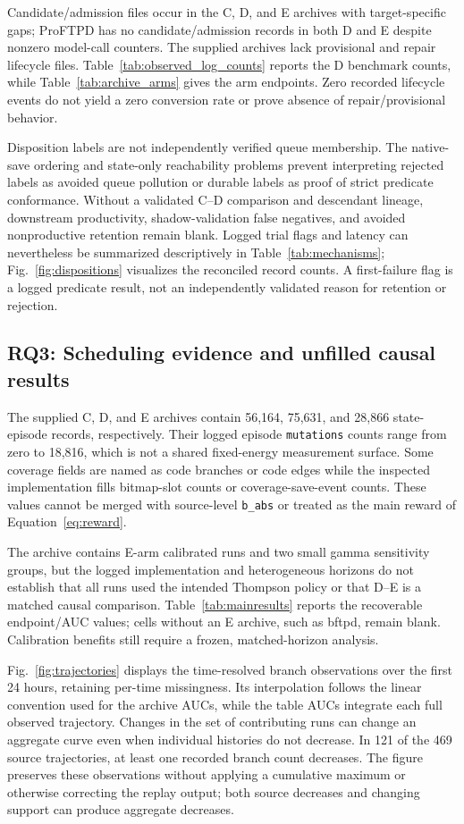 \documentclass[final,5p,times,number]{elsarticle}
\newcommand{\figref}[1]{Fig.~\ref{#1}}
\begin{document}
Candidate/admission files occur in the C, D, and E archives with target-specific gaps; ProFTPD has no candidate/admission records in both D and E despite nonzero model-call counters. The supplied archives lack provisional and repair lifecycle files. Table~\ref{tab:observed_log_counts} reports the D benchmark counts, while Table~\ref{tab:archive_arms} gives the arm endpoints. Zero recorded lifecycle events do not yield a zero conversion rate or prove absence of repair/provisional behavior.

Disposition labels are not independently verified queue membership. The native-save ordering and state-only reachability problems prevent interpreting rejected labels as avoided queue pollution or durable labels as proof of strict predicate conformance. Without a validated C--D comparison and descendant lineage, downstream productivity, shadow-validation false negatives, and avoided nonproductive retention remain blank. Logged trial flags and latency can nevertheless be summarized descriptively in Table~\ref{tab:mechanisms}; \figref{fig:dispositions} visualizes the reconciled record counts. A first-failure flag is a logged predicate result, not an independently validated reason for retention or rejection.

\subsection{RQ3: Scheduling evidence and unfilled causal results}
The supplied C, D, and E archives contain 56,164, 75,631, and 28,866 state-episode records, respectively. Their logged episode \texttt{mutations} counts range from zero to 18,816, which is not a shared fixed-energy measurement surface. Some coverage fields are named as code branches or code edges while the inspected implementation fills bitmap-slot counts or coverage-save-event counts. These values cannot be merged with source-level \texttt{b\_abs} or treated as the main reward of Equation~\ref{eq:reward}.

The archive contains E-arm calibrated runs and two small gamma sensitivity groups, but the logged implementation and heterogeneous horizons do not establish that all runs used the intended Thompson policy or that D--E is a matched causal comparison. Table~\ref{tab:mainresults} reports the recoverable endpoint/AUC values; cells without an E archive, such as bftpd, remain blank. Calibration benefits still require a frozen, matched-horizon analysis.

\figref{fig:trajectories} displays the time-resolved branch observations over the first 24 hours, retaining per-time missingness. Its interpolation follows the linear convention used for the archive AUCs, while the table AUCs integrate each full observed trajectory. Changes in the set of contributing runs can change an aggregate curve even when individual histories do not decrease. In 121 of the 469 source trajectories, at least one recorded branch count decreases. The figure preserves these observations without applying a cumulative maximum or otherwise correcting the replay output; both source decreases and changing support can produce aggregate decreases.
\end{document}
